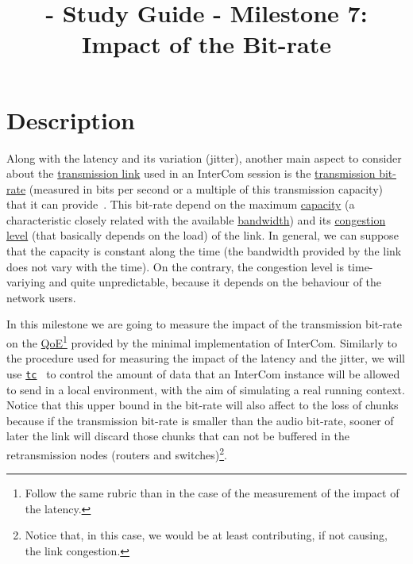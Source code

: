 
\title{\TM{} - Study Guide - Milestone 7: Impact of the Bit-rate}

\maketitle

\section{Description}

Along with the latency and its variation (jitter), another main aspect
to consider about the
\href{https://en.wikipedia.org/wiki/Telecommunications_link}{transmission
  link} used in an InterCom session is the
\href{https://en.wikipedia.org/wiki/Bit_rate}{transmission bit-rate}
(measured in bits per second or a multiple of this transmission
capacity) that it can provide~\cite{Forouzan,Tanenbaum}. This bit-rate
depend on the maximum
\href{https://en.wikipedia.org/wiki/Bandwidth_(computing)}{capacity}
(a characteristic closely related with the available
\href{https://en.wikipedia.org/wiki/Bandwidth_(signal_processing)}{bandwidth})
and its
\href{https://en.wikipedia.org/wiki/Network_congestion}{congestion
  level} (that basically depends on the load) of the link. In general,
we can suppose that the capacity is constant along the time (the
bandwidth provided by the link does not vary with the time). On the
contrary, the congestion level is time-variying and quite
unpredictable, because it depends on the behaviour of the network
users.

In this milestone we are going to measure the impact of the
transmission bit-rate on the
\href{https://en.wikipedia.org/wiki/Quality_of_experience}{QoE}\footnote{Follow
  the same rubric than in the case of the measurement of the impact of
  the latency.} provided by the minimal implementation of InterCom. Similarly to the procedure used for measuring the impact of
the latency and the jitter, we will use
\href{https://man7.org/linux/man-pages/man8/tc.8.html}{\texttt{tc}}~\cite{bert2012lartc}
to control the amount of data that an InterCom instance will be
allowed to send in a local environment, with the aim of simulating a
real running context. Notice that this upper bound in the bit-rate
will also affect to the loss of chunks because if the transmission
bit-rate is smaller than the audio bit-rate, sooner of later the link
will discard those chunks that can not be buffered in the retransmission
nodes (routers and switches)\footnote{Notice that, in this case, we
would be at least contributing, if not causing, the link congestion.}.

